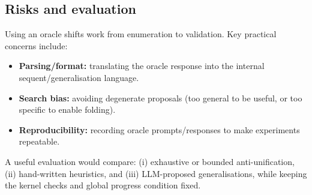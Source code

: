 \subsection{Risks and evaluation}
Using an oracle shifts work from enumeration to validation.
Key practical concerns include:
\begin{itemize}[leftmargin=*]
\item \textbf{Parsing/format:} translating the oracle response into the internal sequent/generalisation language.
\item \textbf{Search bias:} avoiding degenerate proposals (too general to be useful, or too specific to enable folding).
\item \textbf{Reproducibility:} recording oracle prompts/responses to make experiments repeatable.
\end{itemize}
A useful evaluation would compare: (i) exhaustive or bounded anti-unification, (ii) hand-written heuristics, and (iii) LLM-proposed generalisations, while keeping the kernel checks and global progress condition fixed.
